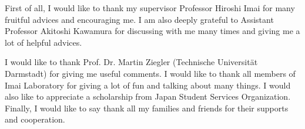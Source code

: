 \begin{acknowledge}
 First of all, I would like to thank my supervisor Professor Hiroshi Imai for
 many fruitful advices and encouraging me. 
 I am also deeply grateful to Assistant Professor Akitoshi Kawamura
 for discussing with me many times and giving me a lot of helpful advices.
 
 I would like to thank Prof. Dr. Martin Ziegler
 (Technische Universit\"at Darmstadt) for giving me useful comments.
 I would like to thank all members of Imai Laboratory 
 for giving a lot of fun and talking about many things.
 I would also like to appreciate a scholarship from
 Japan Student Services Organization.
 Finally, I would like to say thank all my families and friends 
 for their supports and cooperation.
\end{acknowledge}
